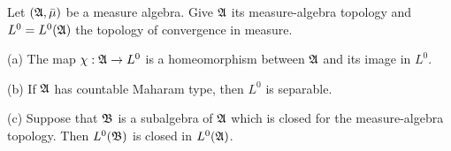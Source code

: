  Let $(\frak A,\bar\mu)$ be a measure
algebra.   Give $\frak A$ its measure-algebra topology
and $L^0=L^0(\frak A)$ the topology of convergence in measure.   

(a) The map $\chi:\frak A\to L^0$ is a homeomorphism between $\frak A$ and
its image in $L^0$.

(b) If $\frak A$ has countable Maharam type, then $L^0$ is
separable.

(c) Suppose that $\frak B$ is a subalgebra of $\frak A$ which
is closed for the measure-algebra topology.   Then
$L^0(\frak B)$ is closed in $L^0(\frak A)$.

